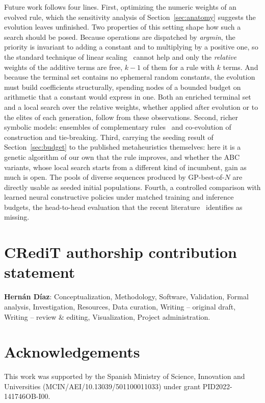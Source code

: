 \documentclass[review,authoryear,11pt]{elsarticle}
\newcommand{\rev}[1]{\textcolor{revcolor}{#1}}
\begin{document}
Future work follows four lines. First, optimizing the numeric weights of
an evolved rule, which the sensitivity analysis of
Section~\ref{sec:anatomy} suggests the evolution leaves unfinished.
Two properties of this setting shape how such a search should be
posed. Because operations are
dispatched by \emph{argmin}, the priority is invariant to adding a
constant and to multiplying by a positive one, so the standard technique
of linear scaling~\citep{Keijzer2003} cannot help and only the
\emph{relative} weights of the additive terms are free, $k-1$ of them
for a rule with $k$ terms. And because the terminal set contains no
ephemeral random constants, the evolution must build coefficients
structurally, spending nodes of a bounded budget on arithmetic that a
constant would express in one. Both an enriched terminal set and a local
search over the relative weights, whether applied after evolution or to
the elites of each generation, follow from these observations.
Second, richer symbolic models:
ensembles of complementary rules~\citep{GilGala2021Ensembles} and
co-evolution of construction and tie-breaking. Third, \rev{carrying the seeding result of
Section~\ref{sec:budget} to the published metaheuristics themselves:
here it is a genetic algorithm of our own that the rule improves, and
whether the ABC variants, whose local search starts from a different
kind of incumbent, gain as much is open.} The pools of diverse sequences produced by
GP-best-of-$N$ are directly usable as seeded initial populations. Fourth, a controlled comparison with learned
neural constructive policies under matched training and inference
budgets, the head-to-head evaluation that the recent
literature~\citep{Xu2025} identifies as missing.

\section*{CRediT authorship contribution statement}
\textbf{Hern\'an D\'iaz}: Conceptualization, Methodology, Software,
Validation, Formal analysis, Investigation, Resources, Data curation,
Writing -- original draft, Writing -- review \& editing, Visualization,
Project administration.

\section*{Acknowledgements}
This work was supported by the Spanish Ministry of Science, Innovation
and Universities (MCIN/AEI/10.13039/501100011033) under grant
PID2022-141746OB-I00.
\end{document}
